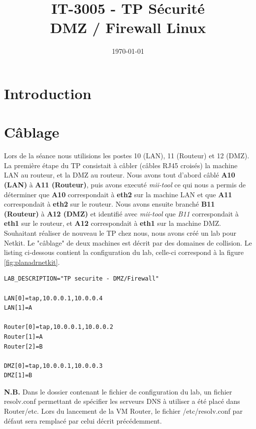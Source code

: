 \documentclass[frenchb, 11pt]{article}
\title{
	\textbf{IT-3005 - TP Sécurité}\\
	DMZ / Firewall Linux
}
\date{\today}
\begin{document}
\maketitle %
\newpage

\tableofcontents
\newpage

\section{Introduction}

\section{Câblage}
Lors de la séance nous utilisions les postes 10 (LAN), 11 (Routeur) et 12 (DMZ). La première étape du TP consistait à câbler (câbles RJ45 croisés) la machine LAN au routeur, et la DMZ au routeur. Nous avons tout d'abord câblé \textbf{A10 (LAN)} à \textbf{A11 (Routeur)}, puis avons executé \emph{mii-tool} ce qui nous a permis de déterminer que \textbf{A10} correspondait à \textbf{eth2} sur la machine LAN et que \textbf{A11} correspondait à \textbf{eth2} sur le routeur. Nous avons ensuite branché \textbf{B11 (Routeur)} à \textbf{A12 (DMZ)} et identifié avec \emph{mii-tool} que \emph{B11} correspondait à \textbf{eth1} sur le routeur, et \textbf{A12} correspondait à \textbf{eth1} sur la machine DMZ.\\

Souhaitant réaliser de nouveau le TP chez nous, nous avons créé un lab pour Netkit. Le "câblage" de deux machines est décrit par des domaines de collision. Le listing ci-dessous contient la configuration du lab, celle-ci correspond à la figure \ref{fig:planadrnetkit}.
\begin{lstlisting}[caption=lab.conf]
LAB_DESCRIPTION="TP securite - DMZ/Firewall"

LAN[0]=tap,10.0.0.1,10.0.0.4
LAN[1]=A

Router[0]=tap,10.0.0.1,10.0.0.2
Router[1]=A
Router[2]=B

DMZ[0]=tap,10.0.0.1,10.0.0.3
DMZ[1]=B
\end{lstlisting}
\textbf{N.B.} Dans le dossier contenant le fichier de configuration du lab, un fichier resolv.conf permettant de spécifier les serveurs DNS à utiliser a été placé dans Router/etc. Lors du lancement de la VM Router, le fichier /etc/resolv.conf par défaut sera remplacé par celui décrit précédemment.\\
\end{document}
